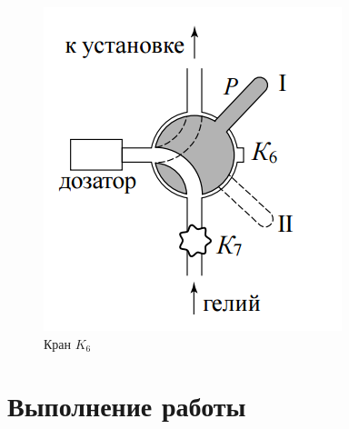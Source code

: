 \documentclass[12pt,a4paper]{article}
\begin{document}
\begin{enumerate}
\begin{figure}[h]
    \centering
    \includegraphics[width=5.5 cm]{crane.PNG}
    \caption{Кран $K_6$}
    \label{fig:vac}
\end{figure} 

\end{enumerate}

\section {Выполнение работы}
\end{document}
